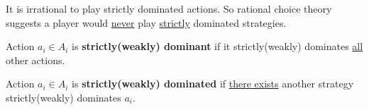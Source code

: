 \documentclass[11pt]{article}
\begin{document}
		\begin{corollary}
			It is irrational to play strictly dominated actions. So rational choice theory suggests a player would \ul{never} play \ul{strictly} dominated strategies.
		\end{corollary}
		
		\begin{definition}
			Action $a_i \in A_i$ is \textbf{strictly(weakly) dominant} if it strictly(weakly) dominates \ul{all} other actions.
		\end{definition}
		
		\begin{definition}
			Action $a_i \in A_i$ is \textbf{strictly(weakly) dominated} if \ul{there exists} another strategy strictly(weakly) dominates $a_i$.
		\end{definition}
		
%		
		
\end{document}
